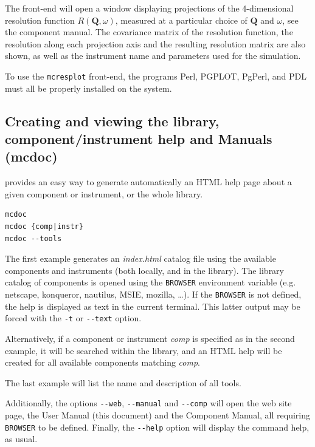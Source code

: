 The front-end will open a window displaying projections of the 4-dimensional
resolution function $R(\boldsymbol{Q}, \omega)$, measured at a
particular choice of $\boldsymbol{Q}$ and $\omega$, see the component
manual. The covariance matrix of the
resolution function, the resolution along each projection axis and the resulting
resolution matrix are also shown, as well as the instrument name and parameters
used for the simulation.

To use the \verb+mcresplot+ front-end, the programs Perl, PGPLOT, PgPerl,
and PDL must all be properly installed on the system.

\subsection{Creating and viewing the library, component/instrument help and
  Manuals (mcdoc)}
\label{s:mcdoc-run}

\MCS provides an easy way to generate automatically an HTML help page about a
given component or instrument, or the whole \MCS
library. 
\begin{lstlisting}
mcdoc
mcdoc {comp|instr}
mcdoc --tools
\end{lstlisting}
The first example generates an \textit{index.html} catalog file using the available
components and instruments (both locally, and in the \MCS library). The library
catalog of components is opened using the \verb+BROWSER+ environment variable
(e.g. netscape, konqueror, nautilus, MSIE,
mozilla, \ldots). If the \verb+BROWSER+ is not defined, the help is displayed as
text in the current terminal. This latter output may be forced with the
\verb+-t+ or \verb+--text+ option.

Alternatively, if a component or instrument \textit{comp} is specified as in the
second example, it will be searched within the library, and an HTML help will be
created for all available components matching \textit{comp}.

The last example will list the name and description of all \MCS tools.

Additionally, the options \verb+--web+, \verb+--manual+ and \verb+--comp+ will
open the \MCS web site page, the User Manual (this document) and the Component
Manual, all requiring \verb+BROWSER+ to be defined. Finally, the \verb+--help+
option will display the command help, as usual.

